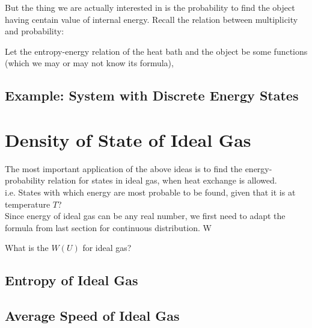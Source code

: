 \documentclass[class=article, crop=false, 12pt]{standalone}
\begin{document}
But the thing we are actually interested in is the probability to find the object having centain value of internal energy.
Recall the relation between multiplicity and probability:



Let the entropy-energy relation of the heat bath and the object be some functions 
(which we may or may not know its formula),




\subsection{Example: System with Discrete Energy States}





\linesep
\section{Density of State of Ideal Gas}



The most important application of the above ideas is to find the
energy-probability relation for states in ideal gas,
when heat exchange is allowed.\\

i.e. States with which energy are most probable to be found,
given that it is at temperature $T$?\\

Since energy of ideal gas can be any real number,
we first need to adapt the formula from last section for continuous distribution.
W

What is the $W(U)$ for ideal gas?



\subsection{Entropy of Ideal Gas}


\subsection{Average Speed of Ideal Gas}
\end{document}

